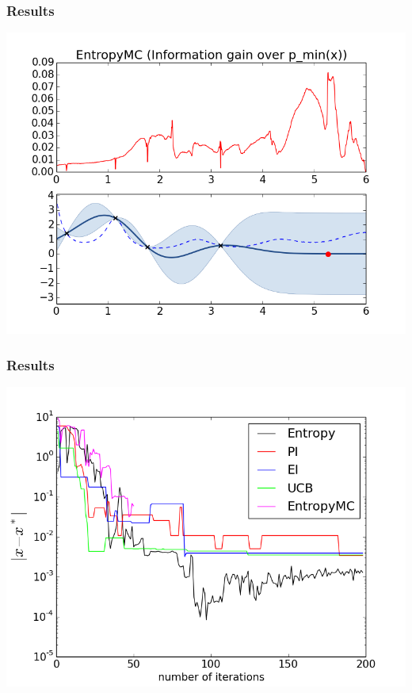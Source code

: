 \documentclass[10pt,handout]{beamer}
\begin{document}
\begin{frame}
\frametitle{Results}
\includegraphics[width=\textwidth]{EntropyMC.png}
\end{frame}
\begin{frame}
\frametitle{Results}
 
\includegraphics[width=\textwidth]{plot_branin2.png}

\end{frame}
\end{document}
